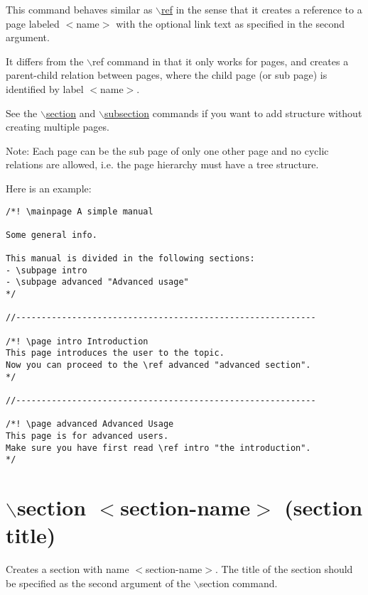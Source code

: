 This command behaves similar as \hyperlink{commands_cmdref}{$\backslash$ref} in the sense that it creates a reference to a page labeled $<$name$>$ with the optional link text as specified in the second argument.

It differs from the $\backslash$ref command in that it only works for pages, and creates a parent-child relation between pages, where the child page (or sub page) is identified by label $<$name$>$.

See the \hyperlink{commands_cmdsection}{$\backslash$section} and \hyperlink{commands_cmdsubsection}{$\backslash$subsection} commands if you want to add structure without creating multiple pages.

\begin{Desc}
\item[Note:]Each page can be the sub page of only one other page and no cyclic relations are allowed, i.e. the page hierarchy must have a tree structure.\end{Desc}
Here is an example: 

\footnotesize\begin{verbatim}
/*! \mainpage A simple manual

Some general info.
  
This manual is divided in the following sections:
- \subpage intro 
- \subpage advanced "Advanced usage"
*/

//-----------------------------------------------------------

/*! \page intro Introduction
This page introduces the user to the topic.
Now you can proceed to the \ref advanced "advanced section".  
*/

//-----------------------------------------------------------

/*! \page advanced Advanced Usage
This page is for advanced users.
Make sure you have first read \ref intro "the introduction".
*/
\end{verbatim}
\normalsize




 \hypertarget{commands_cmdsection}{}\section{$\backslash$section $<$section-name$>$ (section title)}\label{commands_cmdsection}
 Creates a section with name $<$section-name$>$. The title of the section should be specified as the second argument of the $\backslash$section command.

